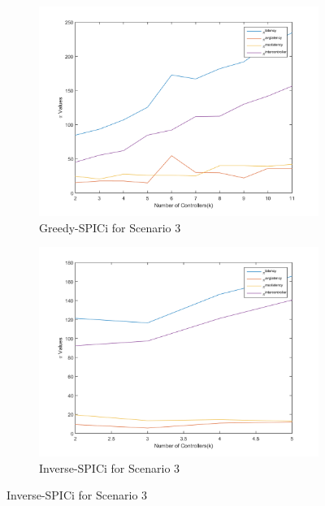 \documentclass[10pt]{extarticle}
\begin{document}
\begin{figure}
\begin{subfigure}{0.5\linewidth}
			\includegraphics[width=\linewidth]{gspici_3.png}
			\caption{Greedy-SPICi for Scenario 3}
			\label{fig:gspici3}
		\end{subfigure}
		\begin{subfigure}{0.5\linewidth}
			\includegraphics[width=\linewidth]{ispici_3.png}
			\caption{Inverse-SPICi for Scenario 3}
			\label{fig:ispici3}
		\end{subfigure}
	\end{figure}
\end{document}
